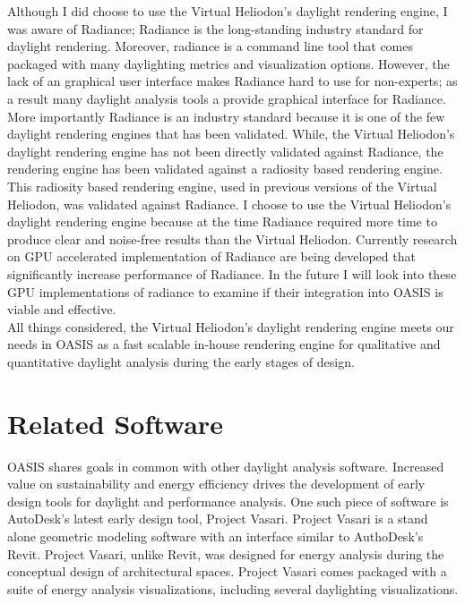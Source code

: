 	Although I did choose to use the Virtual Heliodon's daylight rendering engine, I was aware of Radiance;
	Radiance is the long-standing industry standard for daylight rendering.
	Moreover, radiance is a command line tool that comes packaged with many daylighting metrics and visualization options.
	However, the lack of an graphical user interface makes Radiance hard to use for non-experts; as a result many daylight analysis tools a provide graphical interface for Radiance.
	More importantly Radiance is an industry standard because it is one of the few daylight rendering engines that has been validated\cite{mcneil2013validation}.
	While, the Virtual Heliodon's daylight rendering engine has not been directly validated against Radiance, the rendering engine has been validated against a radiosity based rendering engine.
	This radiosity based rendering engine, used in previous versions of the Virtual Heliodon, was validated against Radiance\cite{sheng2010global}. 
	I choose to use the Virtual Heliodon's daylight rendering engine because at the time Radiance required more time to produce clear and noise-free results than the Virtual Heliodon\cite{compagnon1997radiance}. 
	Currently research on GPU accelerated implementation of Radiance are being developed that significantly increase performance of Radiance\cite{zuo2012acceleration}.
	In the future I will look into these GPU implementations of radiance to examine if their integration into OASIS is viable and effective.
	\\

	All things considered, the Virtual Heliodon's daylight rendering engine meets our needs in OASIS as a fast scalable in-house rendering engine for qualitative and quantitative daylight analysis during the early stages of design.

\section{Related Software}


	OASIS shares goals in common with other daylight analysis software.
	Increased value on sustainability and energy efficiency drives the development of early design tools for daylight and performance analysis.
	One such piece of software is AutoDesk's latest early design tool, Project Vasari\cite{vasari,autodesk}.
	Project Vasari is a stand alone geometric modeling software with an interface similar to AuthoDesk's Revit\cite{revit}.
	Project Vasari, unlike Revit, was designed for energy analysis during the conceptual design of architectural spaces. 
	Project Vasari comes packaged with a suite of energy analysis visualizations, including several daylighting visualizations.\\

